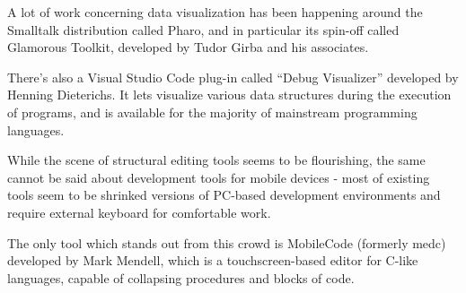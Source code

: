 \documentclass[sigconf]{acmart}
\begin{document}
A lot of work concerning data visualization
has been happening around the Smalltalk
distribution called Pharo, and in particular
its spin-off called Glamorous Toolkit, developed
by Tudor Girba and his associates\cite{Girba}.

There's also a Visual Studio Code plug-in
called ``Debug Visualizer'' developed by Henning
Dieterichs\cite{Dieterichs}. It lets visualize various
data structures during the execution of programs, and is available
for the majority of mainstream programming languages.

While the scene of structural editing tools seems to
be flourishing, the same cannot be said about development
tools for mobile devices - most of existing tools seem to
be shrinked versions of PC-based development environments
and require external keyboard for comfortable work.

The only tool which stands out from this crowd
is MobileCode (formerly medc) developed by Mark Mendell\cite{Mendell},
which is a touchscreen-based editor for C-like languages,
capable of collapsing procedures and blocks of code.
\end{document}

